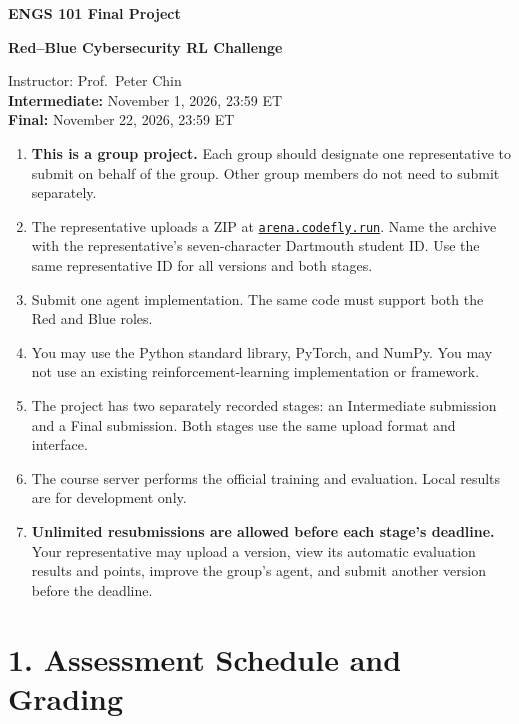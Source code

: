 \documentclass[12pt]{report}
\newcommand{\intermediatedate}{November 1, 2026, 23:59 ET}
\newcommand{\finalduedate}{November 22, 2026, 23:59 ET}
\newcommand{\arenaurl}{https://arena.codefly.run}
\begin{document}
\noindent
\begin{minipage}{\textwidth}
    \raggedright
    \textbf{ENGS 101 Final Project}\\
    \vspace{0.6em}
    \begin{center}
      {\Large \textbf{Red--Blue Cybersecurity RL Challenge}}
    \end{center}
    Instructor: Prof.\ Peter Chin\\
    \textbf{Intermediate:} \intermediatedate\\
    \textbf{Final:} \finalduedate
\end{minipage}

\vspace{0.5em}

\begin{enumerate}[leftmargin=0.25in,label=$\diamond$,itemsep=0.15em]
  \item \textbf{This is a group project.} Each group should designate one
        representative to submit on behalf of the group. Other group members
        do not need to submit separately.
  \item The representative uploads a ZIP at
        \href{\arenaurl}{\texttt{arena.codefly.run}}. Name the archive with
        the representative's seven-character Dartmouth student ID. Use the same
        representative ID for all versions and both stages.
  \item Submit one agent implementation. The same code must support both the
        Red and Blue roles.
  \item You may use the Python standard library, PyTorch, and NumPy. You may
        not use an existing reinforcement-learning implementation or framework.
  \item The project has two separately recorded stages: an Intermediate
        submission and a Final submission. Both stages use the same upload
        format and interface.
  \item The course server performs the official training and evaluation.
        Local results are for development only.
  \item \textbf{Unlimited resubmissions are allowed before each stage's
        deadline.} Your representative may upload a version, view its automatic
        evaluation results and points, improve the group's agent, and submit
        another version before the deadline.
\end{enumerate}

\section*{1. Assessment Schedule and Grading}
\end{document}
